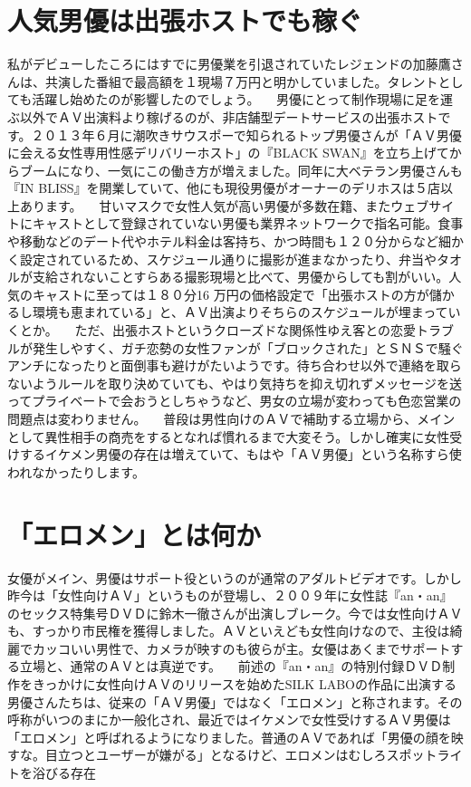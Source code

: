 \documentclass[12pt,UTF8]{ctexbook}
\begin{document}
\section{人気男優は出張ホストでも稼ぐ}

私がデビューしたころにはすでに男優業を引退されていたレジェンドの加藤鷹さんは、共演した番組で最高額を１現場７万円と明かしていました。タレントとしても活躍し始めたのが影響したのでしょう。
　男優にとって制作現場に足を運ぶ以外でＡＶ出演料より稼げるのが、非店舗型デートサービスの出張ホストです。２０１３年６月に潮吹きサウスポーで知られるトップ男優さんが「ＡＶ男優に会える女性専用性感デリバリーホスト」の『BLACK SWAN』を立ち上げてからブームになり、一気にこの働き方が増えました。同年に大ベテラン男優さんも『IN BLISS』を開業していて、他にも現役男優がオーナーのデリホスは５店以上あります。
　甘いマスクで女性人気が高い男優が多数在籍、またウェブサイトにキャストとして登録されていない男優も業界ネットワークで指名可能。食事や移動などのデート代やホテル料金は客持ち、かつ時間も１２０分からなど細かく設定されているため、スケジュール通りに撮影が進まなかったり、弁当やタオルが支給されないことすらある撮影現場と比べて、男優からしても割がいい。人気のキャストに至っては１８０分16
 万円の価格設定で「出張ホストの方が儲かるし環境も恵まれている」と、ＡＶ出演よりそちらのスケジュールが埋まっていくとか。
　ただ、出張ホストというクローズドな関係性ゆえ客との恋愛トラブルが発生しやすく、ガチ恋勢の女性ファンが「ブロックされた」とＳＮＳで騒ぐアンチになったりと面倒事も避けがたいようです。待ち合わせ以外で連絡を取らないようルールを取り決めていても、やはり気持ちを抑え切れずメッセージを送ってプライベートで会おうとしちゃうなど、男女の立場が変わっても色恋営業の問題点は変わりません。
　普段は男性向けのＡＶで補助する立場から、メインとして異性相手の商売をするとなれば慣れるまで大変そう。しかし確実に女性受けするイケメン男優の存在は増えていて、もはや「ＡＶ男優」という名称すら使われなかったりします。

\section{「エロメン」とは何か}

女優がメイン、男優はサポート役というのが通常のアダルトビデオです。しかし昨今は「女性向けＡＶ」というものが登場し、２００９年に女性誌『an・an』のセックス特集号ＤＶＤに鈴木一徹さんが出演しブレーク。今では女性向けＡＶも、すっかり市民権を獲得しました。ＡＶといえども女性向けなので、主役は綺麗でカッコいい男性で、カメラが映すのも彼らが主。女優はあくまでサポートする立場と、通常のＡＶとは真逆です。
　前述の『an・an』の特別付録ＤＶＤ制作をきっかけに女性向けＡＶのリリースを始めたSILK LABOの作品に出演する男優さんたちは、従来の「ＡＶ男優」ではなく「エロメン」と称されます。その呼称がいつのまにか一般化され、最近ではイケメンで女性受けするＡＶ男優は「エロメン」と呼ばれるようになりました。普通のＡＶであれば「男優の顔を映すな。目立つとユーザーが嫌がる」となるけど、エロメンはむしろスポットライトを浴びる存在
\end{document}

